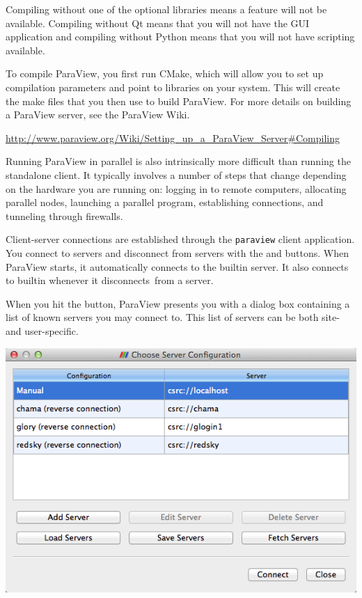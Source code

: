 Compiling without one of the optional libraries means a feature will not be
available.  Compiling without Qt means that you will not have the GUI
application and compiling without Python means that you will not have
scripting available.

To compile ParaView, you first run CMake, which will allow you to set up
compilation parameters and point to libraries on your system.  This will
create the make files that you then use to build ParaView.  For more
details on building a ParaView server, see the ParaView Wiki.

{
  \footnotesize
  \href{http://www.paraview.org/Wiki/Setting_up_a_ParaView_Server#Compiling}{http://www.paraview.org/Wiki/Setting\_up\_a\_ParaView\_Server\#Compiling}
}

Running ParaView in parallel is also intrinsically more difficult than
running the standalone client.  It typically involves a number of steps
that change depending on the hardware you are running on: logging in to
remote computers, allocating parallel nodes, launching a parallel program,
establishing connections, and tunneling through firewalls.

Client-server connections are established through the \texttt{paraview}
client application.  You connect to servers and disconnect from servers
with the \connect and \disconnect buttons.  When ParaView starts, it
automatically connects to the builtin server.  It also connects to
builtin whenever it disconnects~\disconnect from a server.

When you hit the \connect button, ParaView presents you with a dialog box
containing a list of known servers you may connect to.  This list of
servers can be both site- and user-specific.

\begin{inlinefig}
  \includegraphics[width=.75\scw]{images/ChooseServer}
\end{inlinefig}

